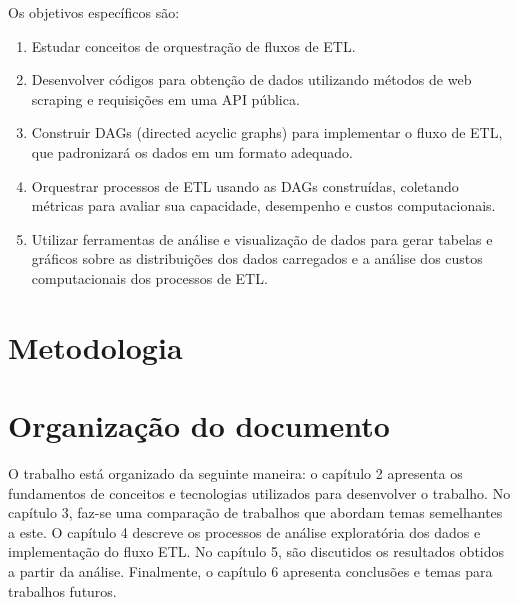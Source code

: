 Os objetivos específicos são:
\begin{enumerate}
    \item Estudar conceitos de orquestração de fluxos de ETL.
    \item Desenvolver códigos para obtenção de dados utilizando métodos de web scraping e requisições em uma API pública.
    \item Construir DAGs (directed acyclic graphs) para implementar o fluxo de ETL, que padronizará os dados em um formato adequado.
    \item Orquestrar processos de ETL usando as DAGs construídas, coletando métricas para avaliar sua capacidade, desempenho e custos computacionais.
    \item Utilizar ferramentas de análise e visualização de dados para gerar tabelas e gráficos sobre as distribuições dos dados carregados e a análise dos custos computacionais dos processos de ETL.
\end{enumerate}

\section{Metodologia}

\section{Organização do documento}

O trabalho está organizado da seguinte maneira: o capítulo 2 apresenta os fundamentos de conceitos e tecnologias utilizados para desenvolver o trabalho. No capítulo 3, faz-se uma comparação de trabalhos que abordam temas semelhantes a este. O capítulo 4 descreve os processos de análise exploratória dos dados e implementação do fluxo ETL. No capítulo 5, são discutidos os resultados obtidos a partir da análise. Finalmente, o capítulo 6 apresenta conclusões e temas para trabalhos futuros.